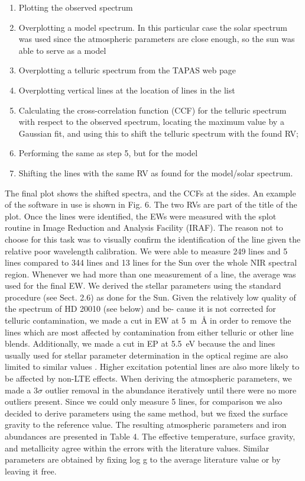 \begin{enumerate}
  \item Plotting the observed spectrum
  \item Overplotting a model spectrum. In this particular case the solar spectrum was used since the
        atmospheric parameters are close enough, so the sun was able to serve as a model
  \item Overplotting a telluric spectrum from the TAPAS web page \citep{Bertaux2014}
  \item Overplotting vertical lines at the location of lines in the list
  \item Calculating the cross-correlation function (CCF) for the telluric spectrum with respect to
        the observed spectrum, locating the maximum value by a Gaussian fit, and using this to shift
        the telluric spectrum with the found RV;
  \item Performing the same as step 5, but for the model
  \item Shifting the lines with the same RV as found for the model/solar spectrum.
\end{enumerate}

The final plot shows the shifted spectra, and the CCFs at the sides. An example of the software in
use is shown in Fig. 6. The two RVs are part of the title of the plot. Once the lines were
identified, the EWs were measured with the splot routine in Image Reduction and Analysis Facility
(IRAF). The reason not to choose \ARES for this task was to visually confirm the identification of
the line given the relative poor wavelength calibration. We were able to measure 249 
lines and 5  lines compared to 344  lines and 13  lines for the
Sun over the whole NIR spectral region. Whenever we had more than one measurement of a line, the
average was used for the final EW. We derived the stellar parameters using the standard procedure
(see Sect. 2.6) as done for the Sun. Given the relatively low quality of the spectrum of HD 20010
(see below) and be- cause it is not corrected for telluric contamination, we made a cut in EW at
\SI{5}{m\angstrom} in order to remove the lines which are most affected by contamination from either
telluric or other line blends. Additionally, we made a cut in EP at \SI{5.5}{eV} because the
 and  lines usually used for stellar parameter determination in the optical
regime are also limited to similar values \citep[see e.g][]{Sousa2008a}. Higher excitation potential
lines are also more likely to be affected by non-LTE effects. When deriving the atmospheric
parameters, we made a $3\sigma$ outlier removal in the abundance iteratively until there were no
more outliers present. Since we could only measure 5  lines, for comparison we also
decided to derive parameters using the same method, but we fixed the surface gravity to the
reference value. The resulting atmospheric parameters and iron abundances are presented in Table 4.
The effective temperature, surface gravity, and metallicity agree within the errors with the
literature values. Similar parameters are obtained by fixing log g to the average literature value
or by leaving it free.


